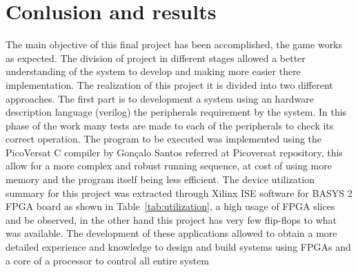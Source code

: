 \section{Conlusion and results}
\label{sec:results}
The main objective of this final project has been accomplished,
the game works as expected. The division of project in different stages allowed a better understanding of the system to develop and making more easier there implementation. The realization of this project it is divided into two different approaches. The first part is to development a system using an hardware description language (verilog) the peripherals requirement by the system. In this phase of the work many tests are made to each of the peripherals to check its correct operation. 
The program to be executed  was implemented using  the PicoVersat C compiler by Gonçalo Santos referred at Picoversat repository, this allow for a more complex and robust running sequence, at cost of using more memory and the program itself being less efficient.
The device utilization summary for this project was extracted through Xilinx ISE software for BASYS 2 FPGA board as shown in Table~\ref{tab:utilization}, a high usage of FPGA slices and be observed, in the other hand this project has very few flip-flops to what was available.
The development of these applications allowed to obtain a more detailed experience and knowledge to design and build systems using FPGAs and a core of a processor to control all entire system

